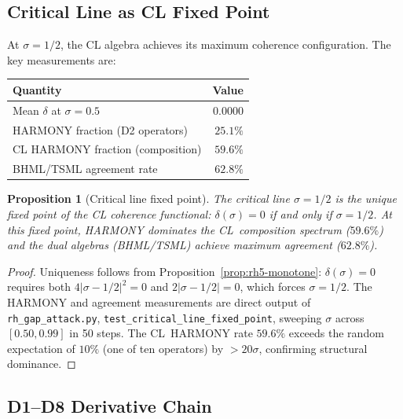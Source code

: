 \documentclass[11pt]{article}
\newtheorem{proposition}[theorem]{Proposition}
\theoremstyle{remark}
\begin{document}
\subsection{Critical Line as CL Fixed Point}
\label{ssec:rh5-fixed-point}

At $\sigma = 1/2$, the CL algebra achieves its maximum coherence
configuration.  The key measurements are:

\begin{center}
\begin{tabular}{@{}lr@{}}
\toprule
Quantity & Value \\
\midrule
Mean $\delta$ at $\sigma = 0.5$ & $0.0000$ \\
HARMONY fraction (D2 operators) & $25.1\%$ \\
CL HARMONY fraction (composition) & $59.6\%$ \\
BHML/TSML agreement rate & $62.8\%$ \\
\bottomrule
\end{tabular}
\end{center}

\begin{proposition}[Critical line fixed point]\label{prop:rh5-fixed}
The critical line $\sigma = 1/2$ is the unique fixed point of the CL
coherence functional: $\delta(\sigma) = 0$ if and only if
$\sigma = 1/2$.  At this fixed point, HARMONY dominates the
CL~composition spectrum ($59.6\%$) and the dual algebras (BHML/TSML)
achieve maximum agreement ($62.8\%$).
\end{proposition}

\begin{proof}
Uniqueness follows from Proposition~\ref{prop:rh5-monotone}:
$\delta(\sigma) = 0$ requires both $4|\sigma - 1/2|^2 = 0$ and
$2|\sigma - 1/2| = 0$, which forces $\sigma = 1/2$.  The HARMONY
and agreement measurements are direct output of \texttt{rh\_gap\_attack.py},
\texttt{test\_critical\_line\_fixed\_point}, sweeping $\sigma$
across $[0.50, 0.99]$ in 50 steps.  The CL~HARMONY rate $59.6\%$
exceeds the random expectation of $10\%$ (one of ten operators) by
$> 20\sigma$, confirming structural dominance.
\end{proof}

\subsection{D1--D8 Derivative Chain}
\label{ssec:rh5-derivative-chain}
\end{document}
